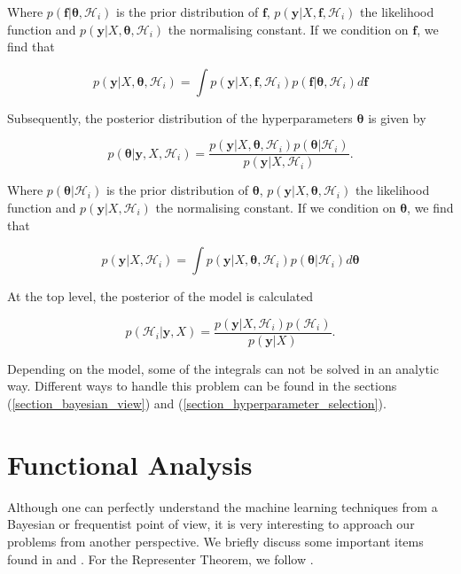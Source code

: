 \documentclass[12pt,a4paper,oneside]{book}
\begin{document}
Where $p(\bm{f}|\bm{\theta},\mathcal{H}_i)$ is the prior distribution of $\bm{f}$, $p(\bm{y}|X,\bm{f},\mathcal{H}_i)$ the likelihood function and $p(\bm{y}|X,\bm{\theta},\mathcal{H}_i)$ the normalising constant. If we condition on $\bm{f}$, we find that 

\begin{equation}\label{Bayesian_analysis2}
p(\bm{y}|X,\bm{\theta},\mathcal{H}_i) = \int p(\bm{y}|X,\bm{f},\mathcal{H}_i)p(\bm{f}|\bm{\theta},\mathcal{H}_i)d\bm{f}
\end{equation}

Subsequently, the posterior distribution of the hyperparameters
$\bm{\theta}$ is given by

\begin{equation}\label{Bayesian_analysis3}
p(\bm{\theta}|\bm{y},X,\mathcal{H}_i) = \dfrac{p(\bm{y}|X,\bm{\theta},\mathcal{H}_i)p(\bm{\theta}|\mathcal{H}_i)}{p(\bm{y}|X,\mathcal{H}_i)}.
\end{equation}

Where $p(\bm{\theta}|\mathcal{H}_i)$ is the prior distribution of $\bm{\theta}$, $p(\bm{y}|X,\bm{\theta},\mathcal{H}_i)$ the likelihood function and $p(\bm{y}|X,\mathcal{H}_i)$ the normalising constant. If we condition on $\bm{\theta}$, we find that 

\begin{equation}\label{Bayesian_analysis4}
p(\bm{y}|X,\mathcal{H}_i) = \int p(\bm{y}|X,\bm{\theta},\mathcal{H}_i)p(\bm{\theta}|\mathcal{H}_i)d\bm{\theta}
\end{equation}

At the top level, the posterior of the model is calculated

\begin{equation}\label{Bayesian_analysis5}
p(\mathcal{H}_i|\bm{y},X) = \dfrac{p(\bm{y}|X,\mathcal{H}_i)p(\mathcal{H}_i)}{p(\bm{y}|X)}.
\end{equation}

Depending on the model, some of the integrals can not be solved in an analytic way. Different ways to handle this problem can be found in the sections (\ref{section_bayesian_view}) and (\ref{section_hyperparameter_selection}). 
 

\section{Functional Analysis}\label{Functional_Analysis}

Although one can perfectly understand the machine learning techniques from a Bayesian or frequentist point of view, it is very interesting to approach our problems from another perspective. We briefly discuss some important items found in \cite{GPRbook} and \cite{sejdinovic2012rkhs}. For the Representer Theorem, we follow \cite{scholkopf2001generalized}.
\end{document}
